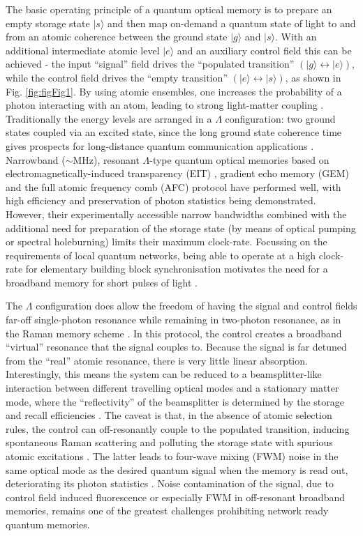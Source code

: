 \documentclass[12pt]{iopart}
\begin{document}
The basic operating principle of a quantum optical memory is to prepare an empty storage state $|s\rangle$ and then map on-demand a quantum state of light to and from an atomic coherence between the ground state $|g\rangle$ and $|s\rangle$. With an additional intermediate atomic level $|e\rangle$ and an auxiliary control field this can be achieved - the input ``signal'' field drives the ``populated transition'' $(|g\rangle \leftrightarrow |e\rangle)$, while the control field drives the ``empty transition'' $(|e\rangle \leftrightarrow |s\rangle)$, as shown in Fig. \ref{fig:figFig1}. By using atomic ensembles, one increases the probability of a photon interacting with an atom, leading to strong light-matter coupling \cite{Thomas2016}. Traditionally the energy levels are arranged in a $\Lambda$ configuration: two ground states coupled via an excited state, since the long ground state coherence time gives prospects for long-distance quantum communication applications \cite{Bussieres2013}. Narrowband ($\sim$MHz), resonant $\Lambda$-type quantum optical memories based on electromagnetically-induced transparency (EIT) \cite{Chaneliere2005,Eisaman2005}, gradient echo memory (GEM) \cite{Hosseini2011} and the full atomic frequency comb (AFC) \cite{Jobez2015} protocol have performed well, with high efficiency \cite{Hedges2010} and preservation of photon statistics \cite{Seri2017} being demonstrated. However, their experimentally accessible narrow bandwidths combined with the additional need for preparation of the storage state (by means of optical pumping or spectral holeburning) limits their maximum clock-rate. Focussing on the requirements of local quantum networks, being able to operate at a high clock-rate for elementary building block synchronisation motivates the need for a broadband memory for short pulses of light \cite{Nunn2013}.

The $\Lambda$ configuration does allow the freedom of having the signal and control fields far-off single-photon resonance while remaining in two-photon resonance, as in the Raman memory scheme \cite{Reim2010a,Chrapkiewicz2017}. In this protocol, the control creates a broadband ``virtual'' resonance that the signal couples to. Because the signal is far detuned from the ``real'' atomic resonance, there is very little linear absorption. Interestingly, this means the system can be reduced to a beamsplitter-like interaction between different travelling optical modes and a stationary matter mode, where the ``reflectivity'' of the beamsplitter is determined by the storage and recall efficiencies \cite{Reim2012,Campbell2014,Fisher2016}. The caveat is that, in the absence of atomic selection rules, the control can off-resonantly couple to the populated transition, inducing spontaneous Raman scattering and polluting the storage state with spurious atomic excitations \cite{Michelberger2015}. The latter leads to four-wave mixing (FWM) noise in the same optical mode as the desired quantum signal when the memory is read out, deteriorating its photon statistics \cite{England2015,Michelberger2015}. Noise contamination of the signal, due to control field induced fluorescence or especially FWM in off-resonant broadband memories, remains one of the greatest challenges prohibiting network ready quantum memories.
\end{document}
